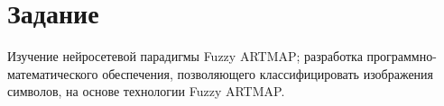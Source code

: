 \newpage
\section{Задание}

Изучение нейросетевой парадигмы Fuzzy ARTMAP; разработка программно-математического обеспечения, позволяющего классифицировать изображения символов, на основе технологии Fuzzy ARTMAP.